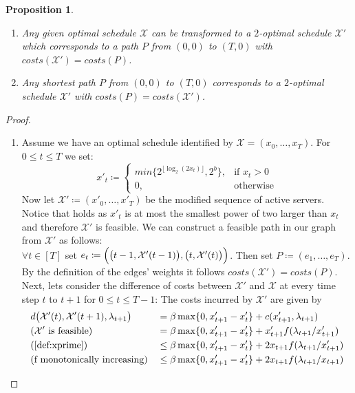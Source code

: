 \documentclass[hidelinks]{article}
\theoremstyle{plain}
\newtheorem{prop}[thm]{Proposition}
\theoremstyle{definition}
\theoremstyle{rem}
\newcommand{\mx}{\mathcal{X}}
\begin{document}
\begin{sloppypar}
\begin{prop}
$ $
\begin{enumerate}
	\item\label{prop:2opt} Any given optimal schedule $\mx$ can be transformed to a $2$-optimal schedule $\mx'$ which corresponds to a path $P$ from $(0,0)$ to $(T,0)$ with $costs(\mx')=costs(P)$.
	\item Any shortest path $P$ from $(0,0)$ to $(T,0)$ corresponds to a $2$-optimal schedule $\mx'$ with $costs(P)=costs(\mx')$.
\end{enumerate}
\end{prop}
\begin{proof}
$ $
\begin{enumerate}
	\item Assume we have an optimal schedule identified by $\mx=(x_0,\ldots,x_T)$. For $0\le t\le T$ we set:
	\begin{equation}
		x'_t\coloneqq 
		\begin{cases}
		  min\bigl\{2^{\lfloor \log_2(2x_t)\rfloor},2^b\bigr\}, & \text{if $x_t>0$}\\
		  0, & \text{otherwise}
		\end{cases} \label{def:xprime}
	\end{equation}
		Now let $\mx'\coloneqq(x'_0,\ldots,x'_T)$ be the modified sequence of active servers. Notice that  holds as $x'_t$ is at most the smallest power of two larger than $x_t$ and therefore $\mx'$ is feasible. We can construct a feasible path in our graph from $\mathcal{X'}$ as follows:\\
	$\forall t\in[T]$ set $e_t\coloneqq\Bigl(\bigl(t-1,\mx'(t-1)\bigr),\bigl(t,\mx'(t)\bigr)\Bigr)$. Then set $P\coloneqq(e_1,\ldots,e_{T})$. By the definition of the edges' weights it follows $costs(\mx')=costs(P)$.\\
		Next, lets consider the difference of costs between $\mx'$ and $\mx$ at every time step $t$ to $t+1$ for $0\le t\le T-1$:
	The costs incurred by $\mx'$ are given by
	\begin{alignat}{2}
		&d\bigl(\mx'(t),\mx'(t+1),\lambda_{t+1}\bigr)&&=\beta\max\{0,x'_{t+1}-x'_t\}+c(x'_{t+1},\lambda_{t+1})\nonumber\\
		&\text{($\mx'$ is feasible)}	&&=\beta\max\{0,x'_{t+1}-x'_t\}+x'_{t+1}f(\lambda_{t+1}/x'_{t+1})\nonumber\\
		&\text(\ref{def:xprime}) &&\le\beta\max\{0,x'_{t+1}-x'_t\}+2x_{t+1}f(\lambda_{t+1}/x'_{t+1})\nonumber\\
		&\text{(f monotonically increasing)} &&\le\beta\max\{0,x'_{t+1}-x'_t\}+2x_{t+1}f(\lambda_{t+1}/x_{t+1})\label{eq:estxprime}

\end{alignat}
\end{enumerate}
\end{proof}
\end{sloppypar}
\end{document}
